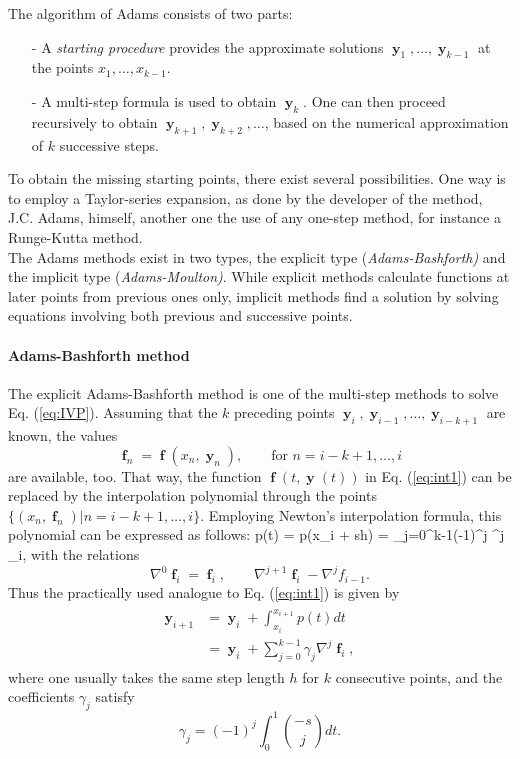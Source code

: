 The algorithm of Adams consists of two parts:
\begin{itemize}
\item[-] A \textit{starting procedure} provides the approximate solutions $\mbfy_1,\dots,\mbfy_{k-1}$ at the points $x_1,\dots,x_{k-1}$.
\item[-] A multi-step formula is used to obtain $\mbfy_{k}$. One can then proceed recursively to obtain $\mbfy_{k+1},\mbfy_{k+2},\dots$, based on the numerical approximation of $k$ successive steps.
\end{itemize}
To obtain the missing starting points, there exist several possibilities. One way is to employ a Taylor-series expansion, as done by the developer of the method, J.C. Adams, himself, another one the use of any one-step method, for instance a Runge-Kutta method. \\
The Adams methods exist in two types, the explicit type 
(\textit{Adams-Bashforth)} and the implicit type (\textit{Adams-Moulton)}. While 
explicit methods calculate functions at later points from previous ones only, 
implicit methods find a solution by solving equations involving both previous and successive points. 

\paragraph{Adams-Bashforth method}
The explicit Adams-Bashforth method is one of the multi-step methods to solve Eq. (\ref{eq:IVP}). Assuming that the $k$ preceding points $\mbfy_i, \mbfy_{i-1},\dots,\mbfy_{i-k+1}$ are known, the values
\[
\mbff_n = \mbff(x_n,\mbfy_n), \qquad \text{for } n= i-k+1,\dots,i
\]
are available, too. That way, the function $\mbff(t,\mbfy(t))$ in Eq. (\ref{eq:int1}) can be replaced by the interpolation polynomial through the points $\lbrace (x_n,\mbff_n)| n= i-k+1,\dots,i\rbrace$. Employing Newton's interpolation formula, this polynomial can be expressed as follows:
\be 
p(t) = p(x_i + sh) = \sum_{j=0}^{k-1}(-1)^j \nabla^j \mbff_i,
\label{eq:inPol}
\ee
with the relations
\[
\nabla^0 \mbff_i = \mbff_i, \qquad \nabla^{j+1} \mbff_i - \nabla^j f_{i-1}.
\]
Thus the practically used analogue to Eq. (\ref{eq:int1}) is given by
\begin{align}
\begin{split}
\mbfy_{i+1}  &= \mbfy_{i} + \int_{x_i}^{x_{i+1}} p(t) dt \\
&= \mbfy_i + \sum_{j=0}^{k-1} \gamma_j \nabla^j \mbff_i,
\label{eq:AB}
\end{split}
\end{align}
where one usually takes the same step length $h$ for $k$ consecutive points, and the coefficients $\gamma_j$ satisfy
\[
\gamma_j = (-1)^j \int_0^1 \binom{-s}{j} dt.
\]

